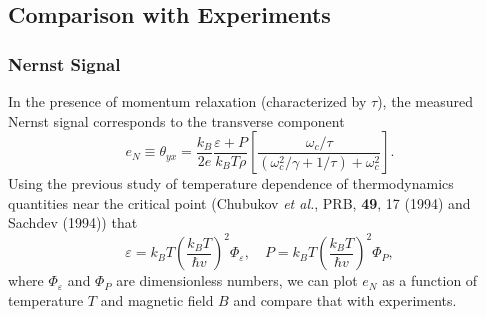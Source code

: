\documentclass[10pt,aspectratio=43,xcolor=x11names,t]{beamer}%
\begin{document}
	\subsection{Comparison with Experiments}
		\begin{frame}\frametitle{Nernst Signal} 
			In the presence of momentum relaxation (characterized by $\tau$), the measured Nernst signal corresponds to the transverse component
			\begin{equation*}
				e_N\equiv\theta_{yx}=\dfrac{k_B}{2e}\dfrac{\varepsilon+P}{k_B T\rho}\left[\dfrac{\omega_c/\tau}{(\omega_c^2/\gamma+1/\tau)+\omega_c^2}\right].
			\end{equation*}
			Using the previous study of temperature dependence of thermodynamics quantities near the critical point ({\scriptsize Chubukov \textit{et al.}, PRB, \textbf{49}, 17 (1994)} and {\scriptsize Sachdev (1994)}) that
			\begin{equation*}
				\varepsilon=k_BT\left(\dfrac{k_BT}{\hbar v}\right)^2\Phi_\varepsilon,\quad P=k_BT \left(\dfrac{k_B T}{\hbar v}\right)^2\Phi_P, 
			\end{equation*}
			where $\Phi_\varepsilon$ and $\Phi_P$ are dimensionless numbers, we can plot $e_N$ as a function of temperature $T$ and magnetic field $B$ and compare that with experiments.
		\end{frame}
		
\end{document}
